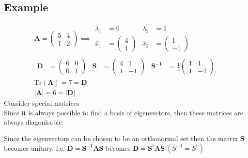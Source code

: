 \documentclass[a4paper, 11pt, normalem]{report}
\begin{document}
\subsection{Example}
\begin{gather*}
    \mathbf{A} =
    \begin{pmatrix}
        5 & 4 \\
        1 & 2
    \end{pmatrix} \implies
    \begin{aligned}
        \lambda_1 &= 6 & \lambda_2 &= 1 \\
        \bar{x}_1 &=
        \begin{pmatrix}
            4 \\
            1
        \end{pmatrix} & \bar{x}_2 &=
        \begin{pmatrix}
            1 \\
            -1
        \end{pmatrix}
    \end{aligned} \\
    \begin{aligned}
        \mathbf{D} &=
        \begin{pmatrix}
            6 & 0 \\
            0 & 1
        \end{pmatrix} & \mathbf{S} &=
        \begin{pmatrix}
            4 & 1 \\
            1 & -1
        \end{pmatrix} & \mathbf{S^{-1}} &= \frac{1}{5}
        \begin{pmatrix}
            1 & 1 \\
            1 & -4
        \end{pmatrix}
    \end{aligned} \\
    \text{Tr}(\mathbf{A}) = 7 = \mathbf{D} \\
    \mathbf{|A|} = 6 = \mathbf{|D|}
\end{gather*}
Consider special matrices \\
Since it is always possible to find a basis of eigenvectors, then these matrices are always diagonisable.

Since the eigenvectors can be chosen to be an orthonormal set then the matrix $\mathbf{S}$ becomes unitary, i.e. $\mathbf{D} = \mathbf{S^{-1}AS}$ becomes $\mathbf{D} = \mathbf{S^{\dagger}AS} ~ (S^{-1} = S^{\dagger})$
\end{document}
